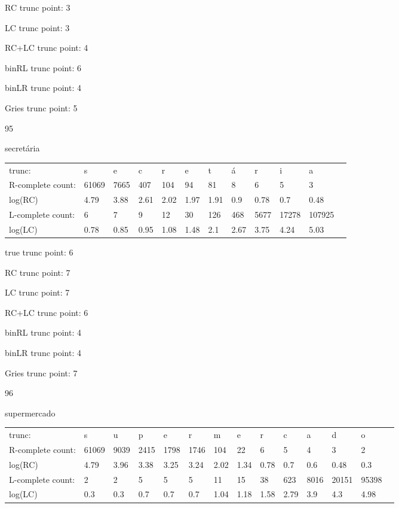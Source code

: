 \documentclass[10pt]{article}
\begin{document}
RC trunc point: 3

LC trunc point: 3

RC+LC trunc point: 4

binRL trunc point: 6

binLR trunc point: 4

Gries trunc point: 5

\vspace{1em}

95

secretária

\begin{tabular}{l|lllllllllll}
trunc: & s & e & c & r & e & t & á & r & i & a & \\ 
R-complete count: & 61069 & 7665 & 407 & 104 & 94 & 81 & 8 & 6 & 5 & 3 & \\ 
log(RC) & 4.79 & 3.88 & 2.61 & 2.02 & 1.97 & 1.91 & 0.9 & 0.78 & 0.7 & 0.48 & \\ 
L-complete count: & 6 & 7 & 9 & 12 & 30 & 126 & 468 & 5677 & 17278 & 107925 & \\ 
log(LC) & 0.78 & 0.85 & 0.95 & 1.08 & 1.48 & 2.1 & 2.67 & 3.75 & 4.24 & 5.03 & \\ 
\end{tabular}

true trunc point: 6

RC trunc point: 7

LC trunc point: 7

RC+LC trunc point: 6

binRL trunc point: 4

binLR trunc point: 4

Gries trunc point: 7

\vspace{1em}

96

supermercado

\begin{tabular}{l|lllllllllllll}
trunc: & s & u & p & e & r & m & e & r & c & a & d & o & \\ 
R-complete count: & 61069 & 9039 & 2415 & 1798 & 1746 & 104 & 22 & 6 & 5 & 4 & 3 & 2 & \\ 
log(RC) & 4.79 & 3.96 & 3.38 & 3.25 & 3.24 & 2.02 & 1.34 & 0.78 & 0.7 & 0.6 & 0.48 & 0.3 & \\ 
L-complete count: & 2 & 2 & 5 & 5 & 5 & 11 & 15 & 38 & 623 & 8016 & 20151 & 95398 & \\ 
log(LC) & 0.3 & 0.3 & 0.7 & 0.7 & 0.7 & 1.04 & 1.18 & 1.58 & 2.79 & 3.9 & 4.3 & 4.98 & \\ 
\end{tabular}
\end{document}
